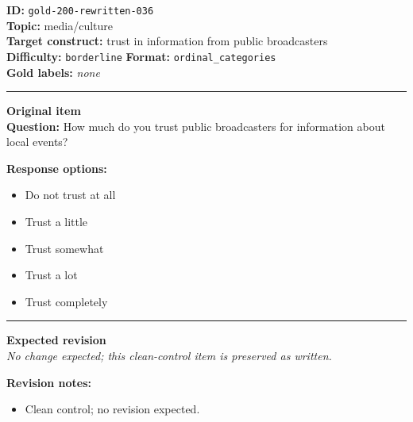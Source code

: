\documentclass[10pt,a4paper]{article}
\newcommand{\sectionline}{\vspace{0.15em}\hrule\vspace{0.35em}}
\begin{document}
\begin{tcolorbox}[colframe=CleanGreen,colback=white,colbacktitle=CleanGreen!9,coltitle=black,title={Item 036\hfill Clean control}]
\textbf{ID:} \texttt{gold-200-rewritten-036}\\
\textbf{Topic:} media/culture\\
\textbf{Target construct:} trust in information from public broadcasters\\
\textbf{Difficulty:} \texttt{borderline} \quad \textbf{Format:} \texttt{ordinal\_categories}\\
\textbf{Gold labels:} \textit{none}\\
\sectionline
\textbf{Original item}\\
\textbf{Question:} How much do you trust public broadcasters for information about local events?
\par\textbf{Response options:}
\begin{itemize}
\item Do not trust at all
\item Trust a little
\item Trust somewhat
\item Trust a lot
\item Trust completely
\end{itemize}
\sectionline
\textbf{Expected revision}\\
\textit{No change expected; this clean-control item is preserved as written.}
\par\textbf{Revision notes:}
\begin{itemize}
\item Clean control; no revision expected.
\end{itemize}
\end{tcolorbox}
\end{document}
